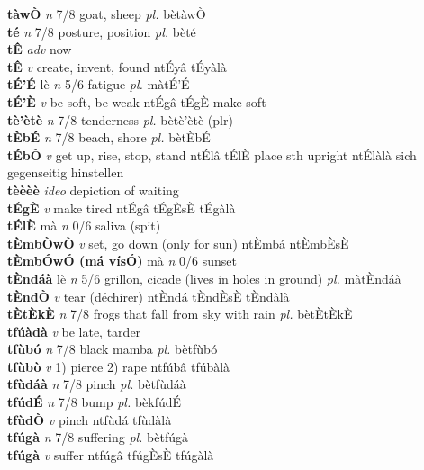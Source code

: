 \documentclass{article}
\begin{document}
{\bf tàwÒ}  {\it n} 7/8 goat, sheep {\it pl.} bètàwÒ         \\ 
{\bf té}  {\it n} 7/8 posture, position {\it pl.} bèté         \\ 
{\bf tÊ}  {\it adv} now         \\ 
{\bf tÊ}  {\it v} create, invent, found   ntÉyâ   tÉyàlà   \\ 
{\bf tÉ'É} lè {\it n} 5/6 fatigue {\it pl.} màtÉ'É         \\ 
{\bf tÉ'È}  {\it v} be soft, be weak   ntÉgâ     tÉgÈ make soft \\ 
{\bf tè'ètè}  {\it n} 7/8 tenderness {\it pl.} bètè'ètè (plr)         \\ 
{\bf tÈbÉ}  {\it n} 7/8 beach, shore {\it pl.} bètÈbÉ         \\ 
{\bf tÉbÒ}  {\it v} get up, rise, stop, stand   ntÉlâ tÉlÈ place sth upright  ntÉlàlà sich gegenseitig hinstellen   \\ 
{\bf tèèèè}  {\it ideo} depiction of waiting         \\ 
{\bf tÉgÈ}  {\it v} make tired   ntÉgâ  tÉgÈsÈ tÉgàlà   \\ 
{\bf tÉlÈ} mà {\it n} 0/6 saliva (spit)         \\ 
{\bf tÈmbÒwÒ}  {\it v} set, go down (only for sun)   ntÈmbá  ntÈmbÈsÈ    \\ 
{\bf tÈmbÓwÓ (má vísÓ)} mà {\it n} 0/6 sunset         \\ 
{\bf tÈndáà} lè {\it n} 5/6 grillon, cicade (lives in holes in ground) {\it pl.} màtÈndáà         \\ 
{\bf tÈndÒ}  {\it v} tear (déchirer)   ntÈndá  tÈndÈsÈ  tÈndàlà   \\ 
{\bf tÈtÈkÈ}  {\it n} 7/8 frogs that fall from sky with rain {\it pl.} bètÈtÈkÈ         \\ 
{\bf tfúàdà}  {\it v} be late, tarder         \\ 
{\bf tfùbó}  {\it n} 7/8 black mamba {\it pl.} bètfùbó         \\ 
{\bf tfùbò}  {\it v} 1) pierce 2) rape   ntfúbâ   tfúbàlà   \\ 
{\bf tfùdáà}  {\it n} 7/8 pinch {\it pl.} bètfùdáà         \\ 
{\bf tfúdÉ}  {\it n} 7/8 bump {\it pl.} bèkfúdÉ         \\ 
{\bf tfùdÒ}  {\it v} pinch   ntfùdá   tfùdàlà   \\ 
{\bf tfúgà}  {\it n} 7/8 suffering {\it pl.} bètfúgà         \\ 
{\bf tfúgà}  {\it v} suffer   ntfúgâ  tfúgÈsÈ tfúgàlà   \\ 
\end{document}
